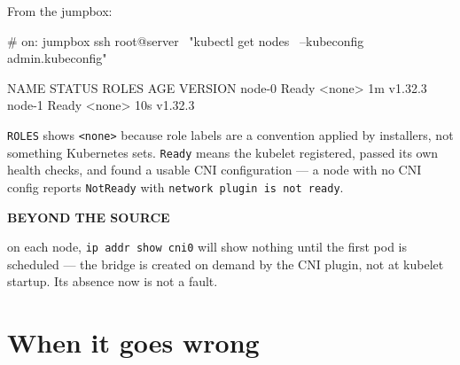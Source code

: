 \documentclass[11pt,oneside]{report}
\newcommand{\calloutlabel}[2]{{\sffamily\bfseries\footnotesize\color{#1}#2\quad}}
\begin{document}
From the jumpbox:

\begin{cmdlst}
# on: jumpbox
ssh root@server \
  "kubectl get nodes \
  --kubeconfig admin.kubeconfig"
\end{cmdlst}

\begin{outlst}
NAME     STATUS   ROLES    AGE    VERSION
node-0   Ready    <none>   1m     v1.32.3
node-1   Ready    <none>   10s    v1.32.3
\end{outlst}

\texttt{ROLES} shows
\texttt{\textless{}none\textgreater{}}
because role labels
are a convention
applied by
installers, not
something Kubernetes
sets. \texttt{Ready}
means the kubelet
registered, passed
its own health
checks, and found a
usable CNI
configuration --- a
node with no CNI
config reports
\texttt{NotReady}
with
\texttt{network\ plugin\ is\ not\ ready}.

\begin{beyondbox}\calloutlabel{teal}{BEYOND THE SOURCE}

on each node,
\texttt{ip\ addr\ show\ cni0}
will show nothing
until the first pod
is scheduled --- the
bridge is created on
demand by the CNI
plugin, not at
kubelet startup. Its
absence now is not a
fault.

\end{beyondbox}

\hypertarget{when-it-goes-wrong-8}{%
\section{When it
goes
wrong}\label{when-it-goes-wrong-8}}
\end{document}
